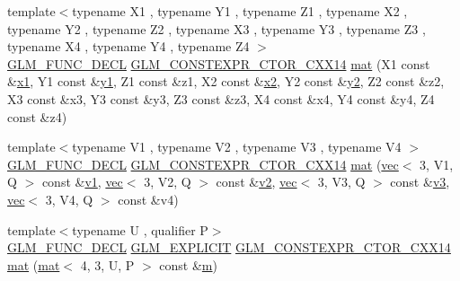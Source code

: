 \begin{DoxyCompactItemize}
\item 
{\footnotesize template$<$typename X1 , typename Y1 , typename Z1 , typename X2 , typename Y2 , typename Z2 , typename X3 , typename Y3 , typename Z3 , typename X4 , typename Y4 , typename Z4 $>$ }\\\mbox{\hyperlink{setup_8hpp_ab2d052de21a70539923e9bcbf6e83a51}{G\+L\+M\+\_\+\+F\+U\+N\+C\+\_\+\+D\+E\+CL}} \mbox{\hyperlink{setup_8hpp_a0900f9145e68bf6061b6f5e7be3fa751}{G\+L\+M\+\_\+\+C\+O\+N\+S\+T\+E\+X\+P\+R\+\_\+\+C\+T\+O\+R\+\_\+\+C\+X\+X14}} \mbox{\hyperlink{structglm_1_1mat_3_014_00_013_00_01_t_00_01_q_01_4_a7ced48f5154c33ac14f3af5771e73446}{mat}} (X1 const \&\mbox{\hyperlink{_s_d_l__opengl__glext_8h_a49825216c96caaeb09237b36651181c5}{x1}}, Y1 const \&\mbox{\hyperlink{_s_d_l__opengl__glext_8h_a3af6c78fcdfccea028a5878bc747ef39}{y1}}, Z1 const \&z1, X2 const \&\mbox{\hyperlink{_s_d_l__opengl__glext_8h_a7b907a03236685c534d89d604cff23c8}{x2}}, Y2 const \&\mbox{\hyperlink{_s_d_l__opengl__glext_8h_a2be1135ed68e8d80fa9e130c7814f8c2}{y2}}, Z2 const \&z2, X3 const \&x3, Y3 const \&y3, Z3 const \&z3, X4 const \&x4, Y4 const \&y4, Z4 const \&z4)
\item 
{\footnotesize template$<$typename V1 , typename V2 , typename V3 , typename V4 $>$ }\\\mbox{\hyperlink{setup_8hpp_ab2d052de21a70539923e9bcbf6e83a51}{G\+L\+M\+\_\+\+F\+U\+N\+C\+\_\+\+D\+E\+CL}} \mbox{\hyperlink{setup_8hpp_a0900f9145e68bf6061b6f5e7be3fa751}{G\+L\+M\+\_\+\+C\+O\+N\+S\+T\+E\+X\+P\+R\+\_\+\+C\+T\+O\+R\+\_\+\+C\+X\+X14}} \mbox{\hyperlink{structglm_1_1mat_3_014_00_013_00_01_t_00_01_q_01_4_a066b9993b2c4aa5d755f83325b1e7870}{mat}} (\mbox{\hyperlink{structglm_1_1vec}{vec}}$<$ 3, V1, Q $>$ const \&\mbox{\hyperlink{_s_d_l__opengl__glext_8h_a435c176a02c061b43e19bdf7c86cceae}{v1}}, \mbox{\hyperlink{structglm_1_1vec}{vec}}$<$ 3, V2, Q $>$ const \&\mbox{\hyperlink{_s_d_l__opengl__glext_8h_a0928f6d0f0f794ba000a21dfae422136}{v2}}, \mbox{\hyperlink{structglm_1_1vec}{vec}}$<$ 3, V3, Q $>$ const \&\mbox{\hyperlink{_s_d_l__opengl__glext_8h_acc806b31cbf466ceba6555983d8b814d}{v3}}, \mbox{\hyperlink{structglm_1_1vec}{vec}}$<$ 3, V4, Q $>$ const \&v4)
\item 
{\footnotesize template$<$typename U , qualifier P$>$ }\\\mbox{\hyperlink{setup_8hpp_ab2d052de21a70539923e9bcbf6e83a51}{G\+L\+M\+\_\+\+F\+U\+N\+C\+\_\+\+D\+E\+CL}} \mbox{\hyperlink{setup_8hpp_a6c74f5a5e7b134ab69023ff9a30d4d5d}{G\+L\+M\+\_\+\+E\+X\+P\+L\+I\+C\+IT}} \mbox{\hyperlink{setup_8hpp_a0900f9145e68bf6061b6f5e7be3fa751}{G\+L\+M\+\_\+\+C\+O\+N\+S\+T\+E\+X\+P\+R\+\_\+\+C\+T\+O\+R\+\_\+\+C\+X\+X14}} \mbox{\hyperlink{structglm_1_1mat_3_014_00_013_00_01_t_00_01_q_01_4_a3531198bc8455e7bcac09cbe197c59fd}{mat}} (\mbox{\hyperlink{structglm_1_1mat}{mat}}$<$ 4, 3, U, P $>$ const \&\mbox{\hyperlink{_s_d_l__opengl__glext_8h_af593500c283bf1a787a6f947f503a5c2}{m}})

\end{DoxyCompactItemize}
